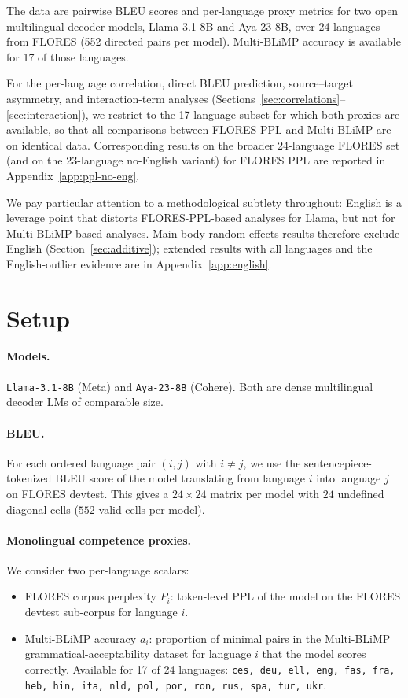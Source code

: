 \documentclass[11pt]{article}
\newcommand{\code}[1]{\texttt{\small #1}}
\begin{document}
The data are pairwise BLEU scores and per-language proxy metrics for
two open multilingual decoder models, Llama-3.1-8B and Aya-23-8B, over
24 languages from FLORES (552 directed pairs per model). Multi-BLiMP
accuracy is available for 17 of those languages.

For the per-language correlation, direct BLEU prediction, source--target
asymmetry, and interaction-term analyses
(Sections~\ref{sec:correlations}--\ref{sec:interaction}), we restrict
to the 17-language subset for which both proxies are available, so that
all comparisons between FLORES PPL and Multi-BLiMP are on identical
data. Corresponding results on the broader 24-language FLORES set
(and on the 23-language no-English variant) for FLORES PPL are
reported in Appendix~\ref{app:ppl-no-eng}.

We pay particular attention to a methodological subtlety throughout:
English is a leverage point that distorts FLORES-PPL-based analyses for
Llama, but not for Multi-BLiMP-based analyses. Main-body random-effects
results therefore exclude English (Section~\ref{sec:additive});
extended results with all languages and the English-outlier evidence
are in Appendix~\ref{app:english}.

\section{Setup}

\paragraph{Models.}
\code{Llama-3.1-8B} (Meta) and \code{Aya-23-8B} (Cohere). Both are dense
multilingual decoder LMs of comparable size.

\paragraph{BLEU.}
For each ordered language pair $(i, j)$ with $i \ne j$, we use the
sentencepiece-tokenized BLEU score of the model translating from
language $i$ into language $j$ on FLORES devtest. This gives a
$24 \times 24$ matrix per model with $24$ undefined diagonal cells
($552$ valid cells per model).

\paragraph{Monolingual competence proxies.}
We consider two per-language scalars:
\begin{itemize}
  \item FLORES corpus perplexity $P_i$: token-level PPL of the model on
    the FLORES devtest sub-corpus for language $i$.
  \item Multi-BLiMP accuracy $a_i$: proportion of minimal pairs in the
    Multi-BLiMP grammatical-acceptability dataset for language $i$ that
    the model scores correctly. Available for 17 of 24 languages:
    \code{ces, deu, ell, eng, fas, fra, heb, hin, ita, nld, pol, por,
    ron, rus, spa, tur, ukr}.
\end{itemize}
\end{document}
